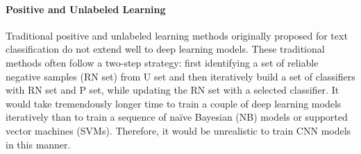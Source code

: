 


\paragraph{Positive and Unlabeled Learning}

Traditional positive and unlabeled learning methods originally proposed for text classification \cite{liu2003building} do not extend well to deep learning models.
These traditional methods often follow a two-step strategy: first identifying a set of reliable negative samples (RN set) from U set and then iteratively build a set of classifiers with RN set and P set, while updating the RN set with a selected classifier.
It would take tremendously longer time to train a couple of deep learning models iteratively than to train a sequence of na\"ive Bayesian (NB) models or supported vector machines (SVMs).
Therefore, it would be unrealistic to train CNN models in this manner.

